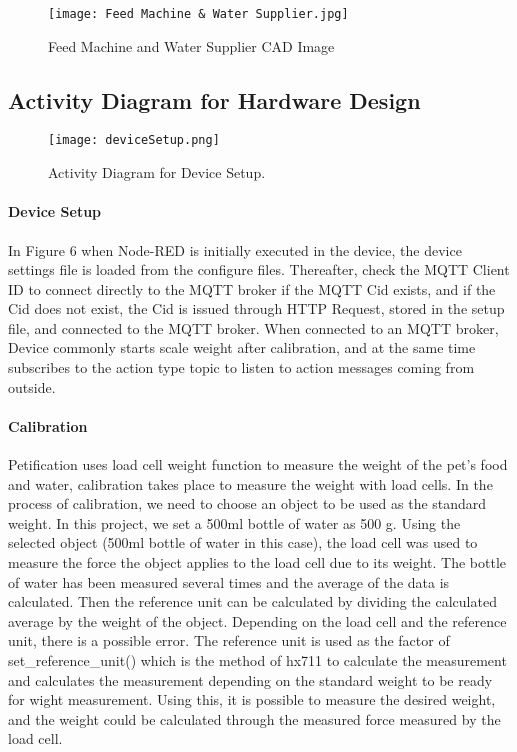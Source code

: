 \documentclass[conference]{IEEEtran}
\begin{document}
\begin{figure}[htbp]
\centerline{\texttt{[image: Feed Machine \& Water Supplier.jpg]}}
\caption{Feed Machine and Water Supplier CAD Image}
\label{fig}
\end{figure}



\subsection{Activity Diagram for Hardware Design}

\begin{figure}[htbp]
\centerline{\texttt{[image: deviceSetup.png]}}
\caption{Activity Diagram for Device Setup.}
\label{fig}
\end{figure}

\paragraph{Device Setup}
In Figure 6 when Node-RED is initially executed in the device, the device settings file is loaded from the configure files.
Thereafter, check the MQTT Client ID to connect directly to the MQTT broker if the MQTT Cid exists, and if the Cid does not exist, the Cid is issued through HTTP Request, stored in the setup file, and connected to the MQTT broker. When connected to an MQTT broker, Device commonly starts scale weight after calibration, and at the same time subscribes to the action type topic to listen to action messages coming from outside.

\paragraph{Calibration}
Petification uses load cell weight function to measure the weight of the pet’s food and water,
calibration takes place to measure the weight with load cells.
In the process of calibration, we need to choose an object to be used as the standard weight. In
this project, we set a 500ml bottle of water as 500 g.
Using the selected object (500ml bottle of water in this case), the load cell was used to measure
the force the object applies to the load cell due to its weight.
The bottle of water has been measured several times and the average of the data is calculated.
Then the reference unit can be calculated by dividing the calculated average by the weight of the
object.
Depending on the load cell and the reference unit, there is a possible error.
The reference unit is used as the factor of set\_reference\_unit() which is the method of hx711 to
calculate the measurement and calculates the measurement depending on the standard weight to
be ready for wight measurement. Using this, it is possible to measure the desired weight, and the
weight could be calculated through the measured force measured by the load cell.
\end{document}
